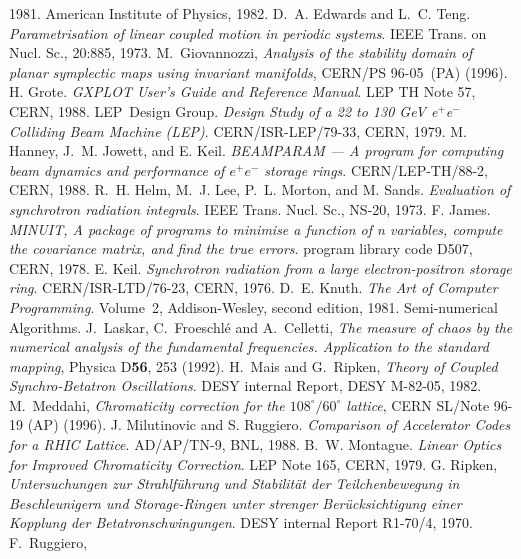 \begin{thebibliography}{10}
{  1981}.
American Institute of Physics, 1982.
D.~A. Edwards and L.~C. Teng.
{\sl Parametrisation of linear coupled motion in periodic systems}.
IEEE Trans. on Nucl. Sc., 20:885, 1973.
M.~Giovannozzi, 
{\sl Analysis of the stability domain of planar symplectic maps using invariant manifolds}, 
CERN/PS 96-05~(PA) (1996).
H. Grote.
{\sl GXPLOT User's Guide and Reference Manual}.
LEP TH Note 57, CERN, 1988.
LEP~Design Group.
{\sl Design Study of a 22 to 130 GeV e\({}^{+}\)e\({}^{-}\) Colliding Beam
  Machine (LEP)}.
CERN/ISR-LEP/79-33, CERN, 1979.
M. Hanney, J.~M. Jowett, and E. Keil.
{\sl BEAMPARAM --- A program for computing beam dynamics and
  performance of $e^{+}e^{-}$ storage rings}.
CERN/LEP-TH/88-2, CERN, 1988.
R.~H. Helm, M.~J. Lee, P.~L. Morton, and M. Sands.
{\sl Evaluation of synchrotron radiation integrals}.
IEEE Trans. Nucl. Sc., NS-20, 1973.
F. James.
{\sl MINUIT, A package of programs to minimise a function of n
  variables, compute the covariance matrix, and find the true errors}.
program library code D507, CERN, 1978.
E. Keil.
{\sl Synchrotron radiation from a large electron-positron storage ring}.
CERN/ISR-LTD/76-23, CERN, 1976.
D.~E. Knuth.
{\sl The Art of Computer Programming}.
Volume~2, Addison-Wesley, second edition, 1981.
Semi-numerical Algorithms.
J.~Laskar, C.~Froeschl\'{e} and A.~Celletti, 
{\sl The measure of chaos by the numerical analysis of the fundamental frequencies. Application to the standard mapping}, 
Physica D{\bf 56}, 253 (1992).
H.~Mais and G.~Ripken,
{\sl Theory of Coupled Synchro-Betatron Oscillations}.
DESY internal Report, DESY M-82-05, 1982.
M.~Meddahi, 
{\sl Chromaticity correction for the $108^{\circ}/60^{\circ}$ lattice}, 
CERN SL/Note 96-19 (AP) (1996).
J. Milutinovic and S. Ruggiero.
{\sl Comparison of Accelerator Codes for a RHIC Lattice}.
AD/AP/TN-9, BNL, 1988.
B.~W. Montague.
{\sl Linear Optics for Improved Chromaticity Correction}.
LEP Note 165, CERN, 1979.
G. Ripken,
{\sl Untersuchungen zur Strahlf\"uhrung und Stabilit\"at der Teilchenbewegung in Beschleunigern und Storage-Ringen unter strenger Ber\"ucksichtigung einer Kopplung der Betatronschwingungen}.
DESY internal Report R1-70/4, 1970.
F.~Ruggiero,

\end{thebibliography}
